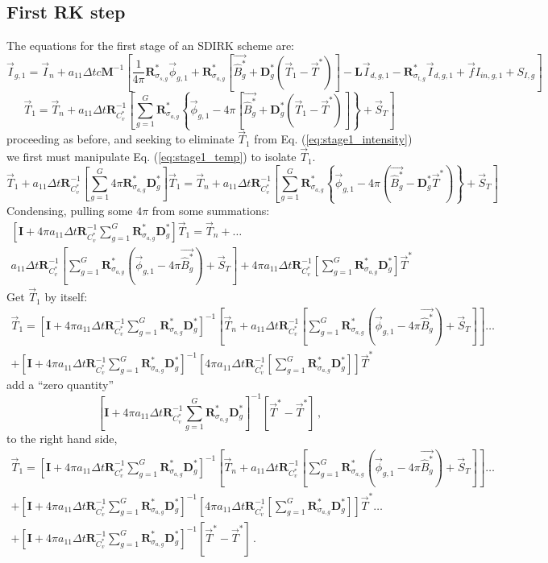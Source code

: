 \documentclass[11pt]{article}
\newcommand{\benum}{\begin{equation}}
\newcommand{\eenum}{\end{equation}}
\newcommand{\be}{\begin{equation*}}
\newcommand{\ee}{\end{equation*}}
\newcommand{\eqt}[1]{Eq. (\ref{#1})}
\newcommand{\pec}{\, ,}
\newcommand{\pep}{\, .}
\newcommand{\M}{\ensuremath{ \mathbf M}}
\newcommand{\R}{\ensuremath{{\mathbf R}}}
\newcommand{\Rag}{\ensuremath{{\mathbf R}_{\sigma_{a,g}}^*}}
\newcommand{\Rsg}{\ensuremath{{\mathbf R}_{\sigma_{s,g}}^*}}
\newcommand{\Rtg}{\ensuremath{{\mathbf R}_{\sigma_{t,g}}^*}}
\newcommand{\Dg}{\ensuremath{ \mathbf D}^*_g}
\newcommand{\Pgvec}{\ensuremath{ \vec{\widehat{B}^*_g}}}
\newcommand{\I}{\ensuremath{\mathbf{I}}}
\begin{document}
\subsection{First RK step}
The equations for the first stage of an SDIRK scheme are:
\benum
\vec{I}_{g,1} = \vec{I}_n + a_{11} \Delta t c\M^{-1}\left[ \frac{1}{4\pi} \Rsg \vec{\phi}_{g,1} + \Rag \left[\Pgvec + \Dg \left(\vec{T}_1- \vec{T}^*  \right)  \right] - \mathbf{L} \vec{I}_{d,g,1} - \Rtg \vec{I}_{d,g,1} + \vec{f}I_{in,g,1} + S_{I,g} \right]
\label{eq:stage1_intensity}
\eenum
\benum
\vec{T}_{1} = \vec{T}_n + a_{11}\Delta t \R_{C_v^*}^{-1}\left[\sum_{g=1}^G{ \Rag \left \{ \vec{\phi}_{g,1} - 4\pi\left[\Pgvec +   \Dg \left(\vec{T}_1 - \vec{T}^*  \right)\right]   \right \} } + \vec{S}_T \right]
\label{eq:stage1_temp}
\eenum
proceeding as before, and seeking to eliminate $\vec{T}_1$ from \eqt{eq:stage1_intensity} we first must manipulate \eqt{eq:stage1_temp} to isolate $\vec{T}_1$.
\be
\vec{T}_1 + a_{11}\Delta t \R_{C_v^*}^{-1}\left[\sum_{g=1}^G{ 4\pi \Rag \Dg}  \right]\vec{T}_1 = \vec{T}_n + 
a_{11}\Delta t \R_{C_v^*}^{-1} \left[ \sum_{g=1}^G{ \Rag \left \{ \vec{\phi}_{g,1} - 4\pi\left( \Pgvec - \Dg \vec{T}^*\right) \right \} }  + \vec{S}_T \right]
\ee
%
Condensing, pulling some $4\pi$ from some summations:
%
\begin{multline*}
\left[\I+ 4\pi a_{11} \Delta t \R_{C_v^*}^{-1}\sum_{g=1}^G{ \Rag \Dg  }\right] \vec{T}_1 = \vec{T}_n + \dots \\
a_{11} \Delta t \R_{C_v^*}^{-1} \left[ \sum_{g=1}^G{ \Rag \left( \vec{\phi}_{g,1} - 4\pi \Pgvec  \right ) } + \vec{S}_T \right]+
4\pi a_{11} \Delta t \R_{C_v^*}^{-1}\left[\sum_{g=1}^G{\Rag \Dg } \right]\vec{T}^*
\end{multline*}
%
Get $\vec{T}_1$ by itself:
%
\begin{multline*}
\vec{T}_1 = \left[\I + 4\pi a_{11} \Delta t \R_{C_v^*}^{-1} \sum_{g=1}^G{ \Rag \Dg  }\right]^{-1}
\left[\vec{T}_n + 
a_{11} \Delta t \R_{C_v^*}^{-1} \left[ \sum_{g=1}^G{ \Rag \left( \vec{\phi}_{g,1} - 4\pi \Pgvec  \right) }  + \vec{S}_T \right] \right]\dots \\
+  \left[\I+ 4\pi a_{11} \Delta t \R_{C_v^*}^{-1}\sum_{g=1}^G{\Rag \Dg }\right]^{-1}
\left[ 4\pi a_{11} \Delta t \R_{C_v^*}^{-1}\left[\sum_{g=1}^G{\Rag \Dg } \right]  \right]\vec{T}^*
\end{multline*}
%
add a ``zero quantity'' 
\be
\left[\I + 4\pi a_{11} \Delta t \R_{C_v^*}^{-1}\sum_{g=1}^G{\Rag \Dg  }\right]^{-1}\left[\vec{T}^* - \vec{T}^*  \right] \pec
\ee
%
to the right hand side,
%
\begin{multline*}
\vec{T}_1 = \left[\I + 4\pi a_{11} \Delta t \R_{C_v^*}^{-1}\sum_{g=1}^G{\Rag \Dg }\right]^{-1}
\left[\vec{T}_n + 
a_{11} \Delta t \R_{C_v^*}^{-1}\left[ \sum_{g=1}^G{ \Rag \left(\vec{\phi}_{g,1} - 4\pi \Pgvec  \right) } + \vec{S}_T \right]  \right]  \dots  \\
+  \left[\I+ 4\pi a_{11} \Delta t \R_{C_v^*}^{-1}\sum_{g=1}^G{\Rag \Dg }\right]^{-1}
\left[ 4\pi a_{11} \Delta t \R_{C_v^*}^{-1}\left[\sum_{g=1}^G{\Rag \Dg } \right]  \right]\vec{T}^* \dots \\
+ \left[\I + 4\pi a_{11} \Delta t \R_{C_v^*}^{-1}\sum_{g=1}^G{\Rag \Dg  }\right]^{-1}\left[\vec{T}^* - \vec{T}^*  \right] \pep
\end{multline*}
\end{document}
